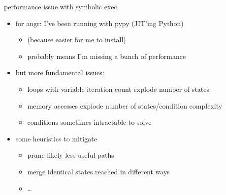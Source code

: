 \begin{frame}{performance issue with symbolic exec}
    \begin{itemize}
    \item for angr: I've been running with pypy (JIT'ing Python)
        \begin{itemize}
        \item (because easier for me to install)
        \item probably means I'm missing a bunch of performance
        \end{itemize}
    \item but more fundamental issues:
        \begin{itemize}
        \item loops with variable iteration count explode number of states
        \item memory accesses explode number of states/condition complexity
        \item conditions sometimes intractable to solve
        \end{itemize}
    \item some heuristics to mitigate
        \begin{itemize}
        \item prune likely less-useful paths
        \item merge identical states reached in different ways
        \item \ldots
        \end{itemize}
    \end{itemize}
\end{frame}
